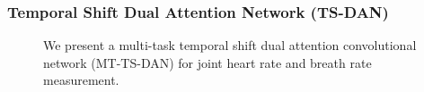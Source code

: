\documentclass[aspectratio=169, table]{beamer}
\begin{document}
\begin{frame}
\frametitle{\textbf{Temporal Shift Dual Attention Network (TS-DAN)}}
\begin{figure}
\caption{We present a multi-task temporal shift dual attention convolutional network (MT-TS-DAN) for joint heart rate and breath rate measurement.}
\label{architecture}
\end{figure}
\end{frame}

\end{document}
